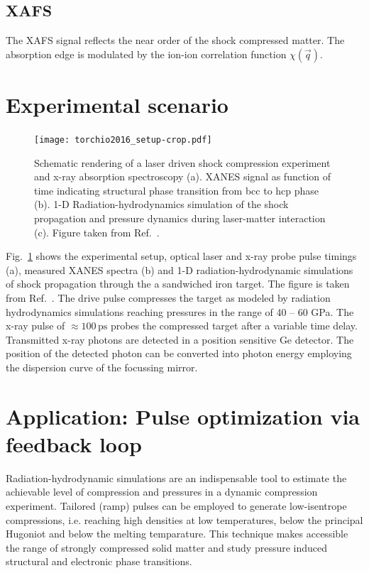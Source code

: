 \documentclass[12pt]{scrartcl}
\begin{document}
\subsection{XAFS}
The XAFS signal reflects the near order of the shock compressed matter. The absorption edge is modulated by the ion-ion correlation function
$\chi(\vec q)$.

\section{Experimental scenario}
\begin{figure}[ht]
  \begin{center}
    \texttt{[image: torchio2016\_setup-crop.pdf]}
  \end{center}
  \caption{Schematic rendering of a laser driven shock compression experiment
  and x-ray absorption spectroscopy (a). XANES signal as function of time
indicating structural phase transition from bcc to hcp phase (b). 1-D
Radiation-hydrodynamics simulation of the shock
propagation and pressure dynamics during laser-matter interaction (c).
Figure taken from Ref.~\cite{Torchio2016}.}
  \label{fig:exp_setup}
\end{figure}
%
Fig.~\ref{fig:exp_setup} shows the experimental setup, optical laser and x-ray
probe pulse timings (a), measured XANES spectra (b) and 1-D radiation-hydrodynamic
simulations of shock propagation through the a sandwiched iron target.
The figure is taken from Ref.~\cite{Torchio2016}. The drive pulse compresses the
target as modeled by radiation hydrodynamics simulations reaching pressures in
the range of 40 -- 60 GPa. The x-ray pulse of $\approx 100\,\text{ps}$ probes
the compressed target after a variable time delay. Transmitted x-ray photons are
detected in a position sensitive Ge detector. The position of the detected
photon can be converted into photon energy employing the dispersion curve of the
focussing mirror.


\section{Application: Pulse optimization via feedback loop}
Radiation-hydrodynamic simulations are an indispensable tool to estimate the
achievable level of compression and pressures in a dynamic compression
experiment. Tailored (ramp) pulses can be employed to generate low-isentrope
compressions, i.e. reaching high densities at low temperatures, below the
principal Hugoniot and below the melting temparature. This technique makes
accessible the range of strongly compressed solid matter and study pressure
induced structural and electronic phase transitions.
\end{document}
